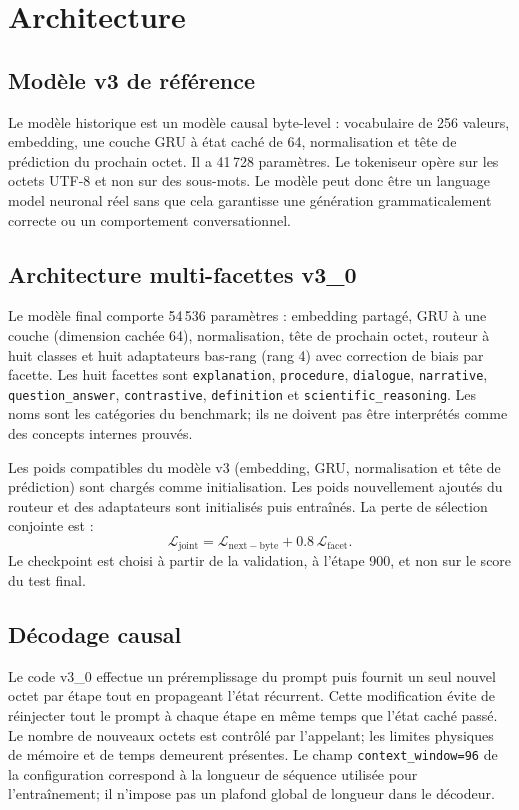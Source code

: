 \documentclass[11pt,a4paper]{article}
\begin{document}
\section{Architecture}
\subsection{Modèle v3 de référence}
Le modèle historique est un modèle causal byte-level : vocabulaire de 256 valeurs, embedding, une couche GRU à état caché de 64, normalisation et tête de prédiction du prochain octet. Il a 41\,728 paramètres. Le tokeniseur opère sur les octets UTF-8 et non sur des sous-mots. Le modèle peut donc être un language model neuronal réel sans que cela garantisse une génération grammaticalement correcte ou un comportement conversationnel.

\subsection{Architecture multi-facettes v3\_0}
Le modèle final comporte 54\,536 paramètres : embedding partagé, GRU à une couche (dimension cachée 64), normalisation, tête de prochain octet, routeur à huit classes et huit adaptateurs bas-rang (rang 4) avec correction de biais par facette. Les huit facettes sont \texttt{explanation}, \texttt{procedure}, \texttt{dialogue}, \texttt{narrative}, \texttt{question\_answer}, \texttt{contrastive}, \texttt{definition} et \texttt{scientific\_reasoning}. Les noms sont les catégories du benchmark; ils ne doivent pas être interprétés comme des concepts internes prouvés.

Les poids compatibles du modèle v3 (embedding, GRU, normalisation et tête de prédiction) sont chargés comme initialisation. Les poids nouvellement ajoutés du routeur et des adaptateurs sont initialisés puis entraînés. La perte de sélection conjointe est :
\[
\mathcal{L}_{\mathrm{joint}} = \mathcal{L}_{\mathrm{next-byte}} + 0.8\,\mathcal{L}_{\mathrm{facet}}.
\]
Le checkpoint est choisi à partir de la validation, à l'étape 900, et non sur le score du test final.

\subsection{Décodage causal}
Le code v3\_0 effectue un préremplissage du prompt puis fournit un seul nouvel octet par étape tout en propageant l'état récurrent. Cette modification évite de réinjecter tout le prompt à chaque étape en même temps que l'état caché passé. Le nombre de nouveaux octets est contrôlé par l'appelant; les limites physiques de mémoire et de temps demeurent présentes. Le champ \texttt{context\_window=96} de la configuration correspond à la longueur de séquence utilisée pour l'entraînement; il n'impose pas un plafond global de longueur dans le décodeur.
\end{document}
